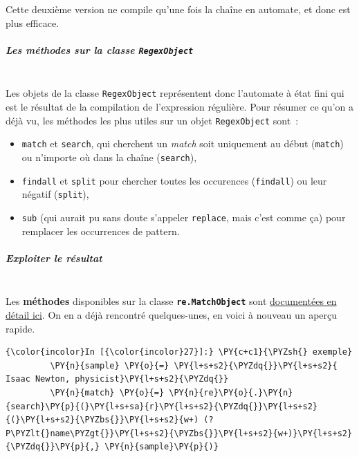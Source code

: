     Cette deuxième version ne compile qu'une fois la chaîne en automate, et
donc est plus efficace.

    \hypertarget{les-muxe9thodes-sur-la-classe-regexobject}{%
\subparagraph{\texorpdfstring{Les méthodes sur la classe
\texttt{RegexObject}\\\\}{Les méthodes sur la classe RegexObject}}\label{les-muxe9thodes-sur-la-classe-regexobject}}

    Les objets de la classe \texttt{RegexObject} représentent donc
l'automate à état fini qui est le résultat de la compilation de
l'expression régulière. Pour résumer ce qu'on a déjà vu, les méthodes
les plus utiles sur un objet \texttt{RegexObject} sont~:

\begin{itemize}
	\item 
	\texttt{match} et \texttt{search}, qui cherchent un \emph{match} soit
	uniquement au début (\texttt{match}) ou n'importe où dans la chaîne
	(\texttt{search}),
	\item
	\texttt{findall} et \texttt{split} pour chercher
	toutes les occurences (\texttt{findall}) ou leur négatif
	(\texttt{split}),
	\item
	\texttt{sub} (qui aurait pu sans doute s'appeler
	\texttt{replace}, mais c'est comme ça) pour remplacer les occurrences de
	pattern.
\end{itemize}

    \hypertarget{exploiter-le-ruxe9sultat}{%
\subparagraph{Exploiter le résultat\\\\}\label{exploiter-le-ruxe9sultat}}

    Les \textbf{méthodes} disponibles sur la classe
\textbf{\texttt{re.MatchObject}} sont
\href{https://docs.python.org/3/library/re.html\#match-objects}{documentées
en détail ici}. On en a déjà rencontré quelques-unes, en voici à nouveau
un aperçu rapide.

    \begin{Verbatim}[commandchars=\\\{\}]
{\color{incolor}In [{\color{incolor}27}]:} \PY{c+c1}{\PYZsh{} exemple}
         \PY{n}{sample} \PY{o}{=} \PY{l+s+s2}{\PYZdq{}}\PY{l+s+s2}{    Isaac Newton, physicist}\PY{l+s+s2}{\PYZdq{}}
         \PY{n}{match} \PY{o}{=} \PY{n}{re}\PY{o}{.}\PY{n}{search}\PY{p}{(}\PY{l+s+sa}{r}\PY{l+s+s2}{\PYZdq{}}\PY{l+s+s2}{(}\PY{l+s+s2}{\PYZbs{}}\PY{l+s+s2}{w+) (?P\PYZlt{}name\PYZgt{}}\PY{l+s+s2}{\PYZbs{}}\PY{l+s+s2}{w+)}\PY{l+s+s2}{\PYZdq{}}\PY{p}{,} \PY{n}{sample}\PY{p}{)}
\end{Verbatim}


